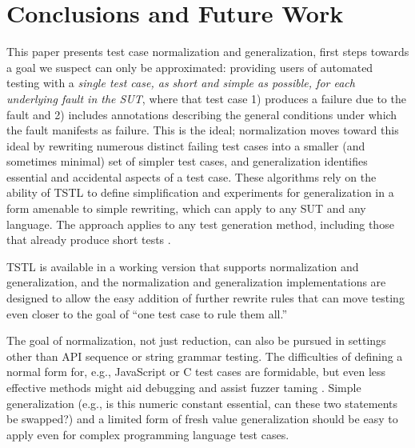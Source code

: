 \section{Conclusions and Future Work}

This paper presents test case normalization and generalization, first
steps towards a goal we suspect can only be approximated: providing
users of automated testing with a \emph{single test case, as short and
  simple as possible, for each underlying fault in the SUT}, where
that test case 1) produces a failure due to the fault and 2) includes
annotations describing the general conditions under which the fault
manifests as failure.  This is the ideal; normalization moves toward
this ideal by rewriting numerous distinct failing test cases into a
smaller (and sometimes minimal) set of simpler test cases, and
generalization identifies essential and accidental aspects of a test
case.  These algorithms rely on the ability of TSTL
\cite{NFM15,ISSTA15} to define simplification and experiments for generalization
in a form amenable to simple rewriting, which can apply to any SUT and
any language.  The approach applies to any test generation method,
including those that already produce short tests \cite{FA11,SoftBET}.

TSTL is available in a working version \cite{tstl} that supports
normalization and generalization, and the normalization and
generalization implementations are designed to allow the easy addition
of further rewrite rules that can move testing even closer to the goal
of ``one test case to rule them all.''

The goal of normalization, not just
reduction, can also be pursued in settings other than API sequence or
string grammar testing.  The difficulties of defining a normal form
for, e.g., JavaScript \cite{jsfunfuzz} or C \cite{CReduce} test cases
are formidable, but even less effective methods might aid debugging and assist fuzzer taming
\cite{PLDI13}.  Simple generalization (e.g., is this numeric constant
essential, can these two statements be swapped?) and a limited form of
fresh value generalization should be easy to apply
even for complex programming language test cases.
